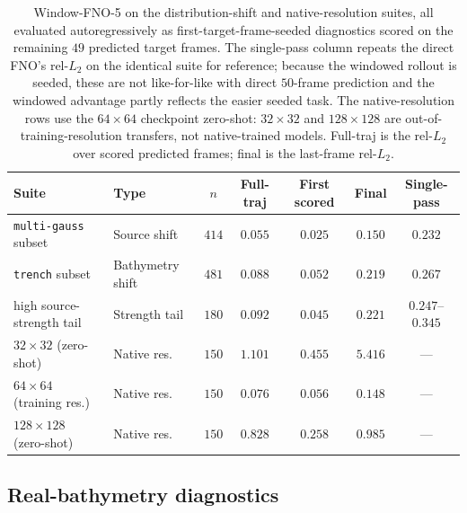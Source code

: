 \begin{table}[H]
\centering
\caption{Window-FNO-5 on the distribution-shift and native-resolution suites, all evaluated autoregressively as first-target-frame-seeded diagnostics scored on the remaining $49$ predicted target frames. The single-pass column repeats the direct FNO's rel-$L_2$ on the identical suite for reference; because the windowed rollout is seeded, these are not like-for-like with direct $50$-frame prediction and the windowed advantage partly reflects the easier seeded task. The native-resolution rows use the $64 \times 64$ checkpoint zero-shot: $32 \times 32$ and $128 \times 128$ are out-of-training-resolution transfers, not native-trained models. Full-traj is the rel-$L_2$ over scored predicted frames; final is the last-frame rel-$L_2$.}
\label{tab:app-window-suites}
\begin{tabular}{llccccc}
    \toprule
    Suite & Type & $n$ & Full-traj & First scored & Final & Single-pass \\
    \midrule
    \texttt{multi-gauss} subset       & Source shift     & $414$ & $0.055$ & $0.025$ & $0.150$ & $0.232$ \\
    \texttt{trench} subset            & Bathymetry shift & $481$ & $0.088$ & $0.052$ & $0.219$ & $0.267$ \\
    high source-strength tail         & Strength tail    & $180$ & $0.092$ & $0.045$ & $0.221$ & $0.247$--$0.345$ \\
    \midrule
    $32 \times 32$ (zero-shot)        & Native res.      & $150$ & $1.101$ & $0.455$ & $5.416$ & --- \\
    $64 \times 64$ (training res.)    & Native res.      & $150$ & $0.076$ & $0.056$ & $0.148$ & --- \\
    $128 \times 128$ (zero-shot)      & Native res.      & $150$ & $0.828$ & $0.258$ & $0.985$ & --- \\
    \bottomrule
\end{tabular}
\end{table}

\subsection{Real-bathymetry diagnostics}

